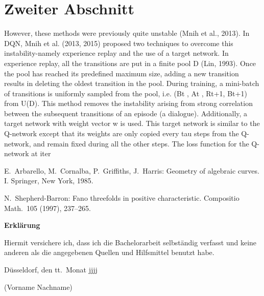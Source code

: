 \documentclass[12pt,titlepage,a4paper]{article}
\begin{document}
\section{Zweiter Abschnitt}

However, these methods were previously quite unstable (Mnih et al., 2013). In DQN,
Mnih et al. (2013, 2015) proposed two techniques
to overcome this instability-namely experience replay and the use of a target network. In experience replay, all the transitions are put in a finite
pool D (Lin, 1993). Once the pool has reached
its predefined maximum size, adding a new transition results in deleting the oldest transition in
the pool. During training, a mini-batch of transitions is uniformly sampled from the pool, i.e.
(Bt
, At
, Rt+1, Bt+1) from U(D). This method removes the instability arising from strong correlation between the subsequent transitions of an
episode (a dialogue). Additionally, a target network with weight vector w is used. This target
network is similar to the Q-network except that
its weights are only copied every tau steps from the
Q-network, and remain fixed during all the other
steps. The loss function for the Q-network at iter

\pagebreak
\begin{thebibliography}{ccccc}

E.\ Arbarello, M.\ Cornalba, P.\ Griffiths, J.\ Harris:
Geometry of algebraic curves. I. 
Springer, New York, 1985.

N.\ Shepherd-Barron:
Fano threefolds in positive characteristic.
Compositio Math.\  105  (1997),  237--265.

\end{thebibliography}



\pagebreak\noindent
\textbf{\LARGE Erkl\"arung}

\bigskip\bigskip
\noindent 
Hiermit versichere ich, dass ich die   Bachelorarbeit selbst\"andig verfasst und keine
anderen als die angegebenen Quellen und Hilfsmittel benutzt habe.

\bigskip
\noindent
D\"usseldorf, den tt.\ Monat jjjj

\bigskip\bigskip\bigskip
\noindent
(Vorname Nachname)
\end{document}
